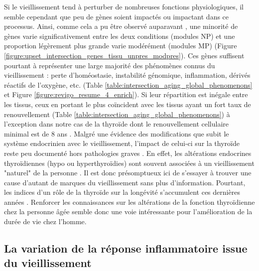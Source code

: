 Si le vieillissement tend à perturber de nombreuses fonctions physiologiques, il semble cependant que peu de gènes soient impactés ou impactant dans ce processus. Ainsi, comme cela a pu être observé auparavant , une minorité de gènes varie significativement entre les deux conditions (modules NP) et une proportion légèrement plus grande varie modérément (modules MP) (Figure \ref{figure:upset_intersection_genes_tissu_unpres_modpres}). Ces gènes suffisent pourtant à représenter une large majorité des phénomènes connus du vieillissement : perte d'homéostasie, instabilité génomique, inflammation, dérivés réactifs de l'oxygène, etc. (Table \ref{table:intersection_aging_global_phenomenons} et Figure \ref{figure:revigo_resume_4_enrich}). Si leur répartition est inégale entre les tissus, ceux en portant le plus coïncident avec les tissus ayant un fort taux de renouvellement  (Table \ref{table:intersection_aging_global_phenomenons}) à l'exception dans notre cas de la thyroïde dont le renouvellement cellulaire minimal est de 8 ans . Malgré une évidence des modifications que subit le système endocrinien avec le vieillissement, l'impact de celui-ci sur la thyroïde reste peu documenté hors pathologies graves . En effet, les altérations endocrines thyroïdiennes (hypo ou hyperthyroïdies) sont souvent associées à un vieillissement "naturel" de la personne . Il est donc présomptueux ici de s'essayer à trouver une cause d'autant de marques du vieillissement sans plus d'information. Pourtant, les indices d'un rôle de la thyroïde sur la longévité s'accumulent ces dernières années . Renforcer les connaissances sur les altérations de la fonction thyroïdienne chez la personne âgée semble donc une voie intéressante pour l'amélioration de la durée de vie chez l'homme.


\subsection{La variation de la réponse inflammatoire issue du vieillissement}

